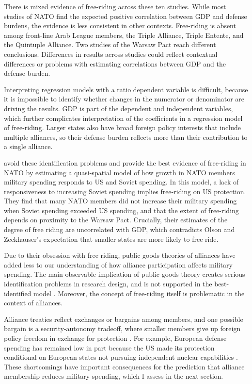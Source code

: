 \documentclass[12pt]{article}
\begin{document}
There is mixed evidence of free-riding across these ten studies. 
While most studies of NATO find the expected positive correlation between GDP and defense burdens, the evidence is less consistent in other contexts. 
Free-riding is absent among front-line Arab League members, the Triple Alliance, Triple Entente, and the Quintuple Alliance. 
Two studies of the Warsaw Pact reach different conclusions. 
Differences in results across studies could reflect contextual differences or problems with estimating correlations between GDP and the defense burden. 


Interpreting regression models with a ratio dependent variable is difficult, because it is impossible to identify whether changes in the numerator or denominator are driving the results. 
GDP is part of the dependent and independent variables, which further complicates interpretation of the coefficients in a regression model of free-riding.
Larger states also have broad foreign policy interests that include multiple alliances, so their defense burden reflects more than their contribution to a single alliance.  


\citet{PluemperNeumayer2015} avoid these identification problems and provide the best evidence of free-riding in NATO by estimating a quasi-spatial model of how growth in NATO members military spending responds to US and Soviet spending. 
In this model, a lack of responsiveness to increasing Soviet spending implies free-riding on US protection. 
They find that many NATO members did not increase their military spending when Soviet spending exceeded US spending, and that the extent of free-riding depends on proximity to the Warsaw Pact.
Crucially, their estimates of the degree of free riding are uncorrelated with GDP, which contradicts Olson and Zeckhauser's expectation that smaller states are more likely to free ride. 


Due to their obsession with free riding, public goods theories of alliances have added less to our understanding of how alliance participation affects military spending. 
The main observable implication of public goods theory creates serious identification problems in research design, and is not supported in the best-identified model \citep{PluemperNeumayer2015}. 
Moreover, the concept of free-riding itself is problematic in the context of alliances. 


Alliance treaties reflect exchanges or bargains among members, and one possible bargain is a security-autonomy tradeoff, where smaller members give up foreign policy freedom in exchange for protection \citep{Morrow1991}. 
For example, European defense spending has remained low in part because the US made its protection conditional on European states not pursuing independent nuclear capabilities \citep{Lanoszka2015}. 
These shortcomings have important consequences for the prediction that alliance membership reduces military spending, which I assess in the next section. 
\end{document}
